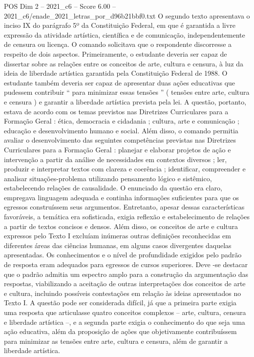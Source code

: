 \begin{textsample}{POS Dim 2 – 2021\_c6 – Score 6.00 – 2021\_c6/enade\_2021\_letras\_por\_d96b21bbf0.txt}
O segundo texto apresentava o inciso IX do parágrafo 5º da Constituição Federal, em que é garantida a livre expressão da atividade artística, científica e de comunicação, independentemente de censura ou licença.
O comando solicitava que o respondente discorresse a respeito de dois aspectos.
Primeiramente, o estudante deveria ser capaz de dissertar sobre as relações entre os conceitos de arte, cultura e censura, à luz da ideia de liberdade artística garantida pela Constituição Federal de 1988.
O estudante também deveria ser capaz de apresentar duas ações educativas que pudessem contribuir “ para minimizar essas tensões ” ( tensões entre arte, cultura e censura ) e garantir a liberdade artística prevista pela lei.
A questão, portanto, estava de acordo com os temas previstos nas Diretrizes Curriculares para a Formação Geral : ética, democracia e cidadania ; cultura, arte e comunicação ; educação e desenvolvimento humano e social.
Além disso, o comando permitia avaliar o desenvolvimento das seguintes competências previstas nas Diretrizes Curriculares para a Formação Geral : planejar e elaborar projetos de ação e intervenção a partir da análise de necessidades em contextos diversos ; ler, produzir e interpretar textos com clareza e coerência ; identificar, compreender e analisar situações-problema utilizando pensamento lógico e sistêmico, estabelecendo relações de causalidade.
O enunciado da questão era claro, empregava linguagem adequada e continha informações suficientes para que os egressos construíssem seus argumentos.
Entretanto, apesar dessas características favoráveis, a temática era sofisticada, exigia reflexão e estabelecimento de relações a partir de textos concisos e densos.
Além disso, os conceitos de arte e cultura expressos pelo Texto I excluíam inúmeras outras definições reconhecidas em diferentes áreas das ciências humanas, em alguns casos divergentes daquelas apresentadas.
Os conhecimentos e o nível de profundidade exigidos pelo padrão de resposta eram adequados para egressos de cursos superiores.
Deve -se destacar que o padrão admitia um espectro amplo para a construção da argumentação das respostas, viabilizando a aceitação de outras interpretações dos conceitos de arte e cultura, incluindo possíveis contestações em relação às ideias apresentados no Texto I.
A questão pode ser considerada difícil, já que a primeira parte exigia uma resposta que articulasse quatro conceitos complexos – arte, cultura, censura e liberdade artística –, e a segunda parte exigia o conhecimento do que seja uma ação educativa, além da proposição de ações que objetivamente contribuíssem para minimizar as tensões entre arte, cultura e censura, além de garantir a liberdade artística.

\end{textsample}
